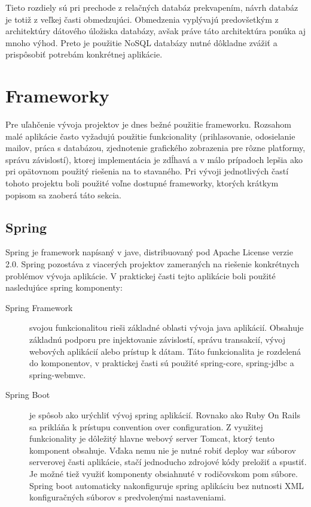 	Tieto rozdiely sú pri prechode z relačných databáz prekvapením, návrh databáz je totiž z veľkej časti obmedzujúci. Obmedzenia vyplývajú predovšetkým z architektúry dátového úložiska databázy, avšak práve táto architektúra ponúka aj mnoho výhod. Preto je použitie NoSQL databázy nutné dôkladne zvážiť a prispôsobiť potrebám konkrétnej aplikácie.
	
\section{Frameworky}
	Pre uľahčenie vývoja projektov je dnes bežné použitie frameworku. Rozsahom malé aplikácie často vyžadujú použitie funkcionality (prihlasovanie, odosielanie mailov, práca s databázou, zjednotenie grafického zobrazenia pre rôzne platformy, správu závislostí), ktorej implementácia je zdĺhavá a v málo prípadoch lepšia ako pri opätovnom použitý riešenia na to stavaného. Pri vývoji jednotlivých častí tohoto projektu boli použité voľne dostupné frameworky, ktorých krátkym popisom sa zaoberá táto sekcia.

	\subsection{Spring}
	Spring je framework napísaný v jave, distribuovaný pod Apache License verzie 2.0. Spring pozostáva z viacerých projektov zameraných na riešenie konkrétnych problémov vývoja aplikácie. V praktickej časti tejto aplikácie boli použité nasledujúce spring komponenty:
	\begin{description}
		\item[Spring Framework] svojou funkcionalitou rieši základné oblasti vývoja java aplikácií. Obsahuje základnú podporu pre injektovanie závislostí, správu transakcií, vývoj webových aplikácií alebo prístup k dátam. Táto funkcionalita je rozdelená do komponentov, v praktickej časti sú použité spring-core, spring-jdbc a spring-webmvc.
		
		\item[Spring Boot] je spôsob ako urýchliť vývoj spring aplikácií. Rovnako ako Ruby On Rails sa prikláňa k prístupu convention over configuration. Z využitej funkcionality je dôležitý hlavne webový server Tomcat, ktorý tento komponent obsahuje. Vďaka nemu nie je nutné robiť deploy war súborov serverovej časti aplikácie, stačí jednoducho zdrojové kódy preložiť a spustiť. Je možné tiež využiť komponenty obsiahnuté v rodičovskom pom súbore. Spring boot automaticky nakonfiguruje spring aplikáciu bez nutnosti XML konfiguračných súborov s predvolenými nastaveniami.
	\end{description}
		
